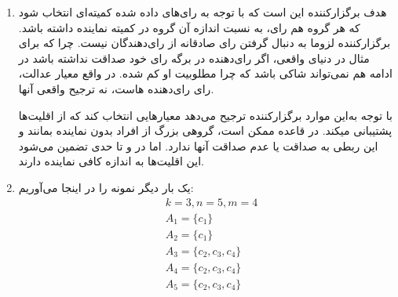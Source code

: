 \documentclass[12pt]{article}
\begin{document}
\begin{enumerate}
{         برای قاعده
         ثابت می‌کنیم که دارای
         است، اما دارای
         و در نتیجه
         نیست.
          
         ابتدا با برهان خلف ثابت می‌کنیم که در معیار 
         صدق می‌کند. فرض کنید 
         $S$ گروهی بیشتر از
         $\frac{n}{k}$
         رای‌دهنده باشند که کاندید $c$
         در اشتراک مجموعه‌های موردتاییدشان باشند اما هیچ‌کدام در کمیته نهایی نماینده
         نداشته باشند. فرض کنید $c'$
         در کمترین مجموعه تاییدی دیگر بازیکنان به عنوان تنها کاندید در کمیته،
         حضور داشته باشد. در این صورت خارج کردن $c'$
         حداکثر امتیاز
         $\frac{n - \frac{n}{k}}{k}$
         را از کمیته کم می‌کند و اضافه کردن $c$
         امتیاز $\frac{n}{k}$ 
         را به کمیته اضافه می‌کند. پس کمیته‌ای که با حذف $c'$
         و اضافه کردن $c$
         به دست می‌آید امتیاز بالاتری دارد که تناقض است. (در این صورت نباید $W$ انتخاب می‌شد.)
         پس کمیته‌ای که با قاعده
         به دست می‌آید دارای 
         است.

         برای اینکه ثابت کنیم خروجی این قاعده 
         لزوما دارای
         نیست، همان مثالی که در اولین قسمت سوال اول این بخش زدیم را
         در نظر می‌گیریم. 
         (
            همان مثالی که  بود اما  نه
         )
         در آن مثال، این قاعده همان
         خروجی 
         $\{c_1, c_3, c_4\}$
         را می‌دهد که همانطور که ثابت کردیم
         دارای 
         نیست. 


    }
    \item {
        هدف برگزارکننده این است که با توجه به رای‌های داده شده
        کمیته‌ای انتخاب شود که هر گروه هم رای، به نسبت اندازه 
        آن گروه در کمیته
         نماینده داشته باشد.
        برگزارکننده لزوما به دنبال گرفتن رای صادقانه از رای‌دهندگان نیست. چرا که
        برای مثال در دنیای واقعی، اگر رای‌دهنده در برگه رای خود صداقت نداشته باشد
        در ادامه هم نمی‌تواند شاکی باشد که چرا مطلوبیت او کم شده. در واقع معیار
        عدالت،
        رای
        رای‌دهنده هاست، نه ترجیح واقعی آنها.

        با توجه به‌این موارد برگزارکننده ترجیح می‌دهد معیارهایی انتخاب کند که از 
        اقلیت‌ها پشتیبانی میکند. در قاعده
        ممکن است، گروهی بزرگ از افراد بدون نماینده بمانند و این ربطی به صداقت یا 
        عدم صداقت آنها ندارد. اما در 
        و
        تا حدی
        تضمین می‌شود این اقلیت‌‌ها به اندازه کافی نماینده دارند.
    }
    \item {
        یک بار دیگر نمونه را در اینجا می‌آوریم:
        \begin{align*}
            &k=3, n=5, m=4 \\
            &A_1 = \{c_1\} \\ 
            &A_2 = \{c_1\} \\ 
            &A_3 = \{c_2, c_3, c_4\} \\ 
            &A_4 = \{c_2, c_3, c_4\} \\ 
            &A_5 = \{c_2, c_3, c_4\} \\ 
        \end{align*}

}
\end{enumerate}
\end{document}
